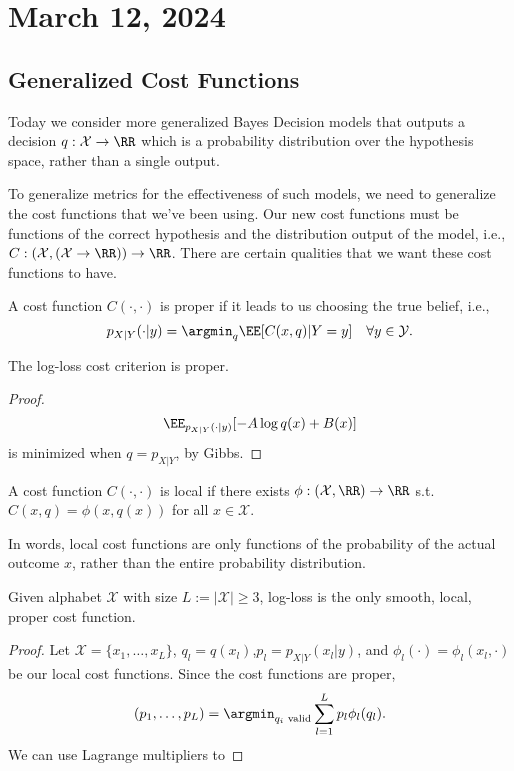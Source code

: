 \section{March 12, 2024}

\subsection{Generalized Cost Functions}

Today we consider more generalized Bayes Decision models that outputs a decision $q: \mathcal{X}\rightarrow \RR$ which is a probability distribution over the hypothesis space, rather than a single output. 

To generalize metrics for the effectiveness of such models, we need to generalize the cost functions that we've been using. Our new cost functions must be functions of the correct hypothesis and the distribution output of the model, i.e., $C: (\mathcal{X}, (\mathcal{X}\rightarrow \RR))\rightarrow \RR$. There are certain qualities that we want these cost functions to have. 

\begin{definition}

A cost function $C(\cdot, \cdot)$ is \ac{proper} if it leads to us choosing the true belief, i.e., 
\[p_{X|Y}(\cdot | y) = \argmin_{q}\EE[C(x,q)|Y=y]\quad \forall y\in \mathcal{Y}.\] 
\end{definition}

\begin{theorem}
\claimlabel

The log-loss cost criterion is proper.
\end{theorem}

\begin{proof}
	\[\EE_{p_{X|Y}(\cdot | y)}[-A\log q(x) + B(x)]\]
is minimized when $q = p_{X|Y}$, by Gibbs.
\end{proof}

\begin{definition}

A cost function $C(\cdot, \cdot)$ is \ac{local} if there exists $\phi: (\mathcal{X}, \RR)\rightarrow \RR$ s.t. $C(x,q) = \phi(x,q(x))$ for all $x\in \mathcal{X}$.
\end{definition}

In words, local cost functions are only functions of the probability of the actual outcome $x$, rather than the entire probability distribution. 

\begin{theorem}
\thmlabel

Given alphabet $\mathcal{X}$ with size $L := \vert \mathcal{X}\vert\geq 3$, log-loss is the only smooth, local, proper cost function.
\end{theorem}

\begin{proof}
	Let $\mathcal{X} = \{x_1,\hdots, x_L\}$, $q_l = q(x_l)$,$p_l = p_{X|Y}(x_l|y)$, and $\phi_l(\cdot) = \phi_l(x_l,\cdot)$ be our local cost functions. Since the cost functions are proper, 
	\[(p_1,\hdots,p_L) = \argmin_{q_i\text{ valid}} \sum_{l=1}^L p_l\phi_l(q_l).\] 
We can use Lagrange multipliers to 
\end{proof}
